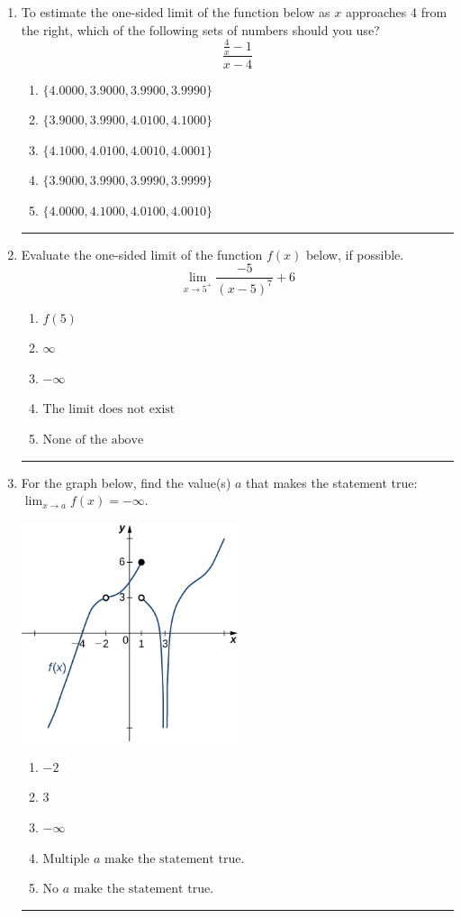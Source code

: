 \documentclass[14pt]{extbook}
\newcommand{\litem}[1]{\item#1\hspace*{-1cm}\rule{\textwidth}{0.4pt}}
\begin{document}
\begin{enumerate}
{\begin{enumerate}[label=\Alph*.]
\end{enumerate} }
\litem{
To estimate the one-sided limit of the function below as $x$ approaches 4 from the right, which of the following sets of numbers should you use?\[ \frac{\frac{4}{x} - 1}{x - 4} \]\begin{enumerate}[label=\Alph*.]
\item \( \{ 4.0000, 3.9000, 3.9900, 3.9990 \} \)
\item \( \{ 3.9000, 3.9900, 4.0100, 4.1000 \} \)
\item \( \{ 4.1000, 4.0100, 4.0010, 4.0001 \} \)
\item \( \{ 3.9000, 3.9900, 3.9990, 3.9999 \} \)
\item \( \{ 4.0000, 4.1000, 4.0100, 4.0010 \} \)

\end{enumerate} }
\litem{
Evaluate the one-sided limit of the function $f(x)$ below, if possible.\[ \lim_{x \rightarrow 5^+} \frac{-5}{(x-5)^7}+6 \]\begin{enumerate}[label=\Alph*.]
\item \( f(5) \)
\item \( \infty \)
\item \( -\infty \)
\item \( \text{The limit does not exist} \)
\item \( \text{None of the above} \)

\end{enumerate} }
\litem{
For the graph below, find the value(s) $a$ that makes the statement true: $ \displaystyle \lim_{x \rightarrow a} f(x) = -\infty$.
\begin{center}
    \includegraphics[width=0.5\textwidth]{../Figures/evaluateLimitGraphicallyCopyA.png}
\end{center}
\begin{enumerate}[label=\Alph*.]
\item \( -2 \)
\item \( 3 \)
\item \( -\infty \)
\item \( \text{Multiple } a \text{ make the statement true}. \)
\item \( \text{No } a \text{ make the statement true}. \)


\end{enumerate}}
\end{enumerate}
\end{document}
